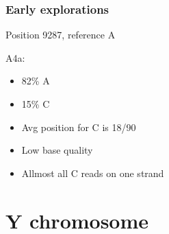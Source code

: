 \documentclass[slidestop,14pt]{beamer}
\begin{document}
\begin{frame}
  \frametitle{Early explorations}



  \vspace{-0.214\paperwidth}

  Position 9287, reference A

  \vspace{\baselineskip}

  \pause

  A4a:
  \begin{itemize}
    \item 82\% {\color{Green} A}
    \item 15\% {\color{Red} C}
    \item<3-> Avg position for {\color{Red} C} is 18/90
    \item<3-> Low base quality
    \item<3-> Allmost all {\color{Red} C} reads on one strand
  \end{itemize}
\end{frame}

\section{Y chromosome}

\end{document}

